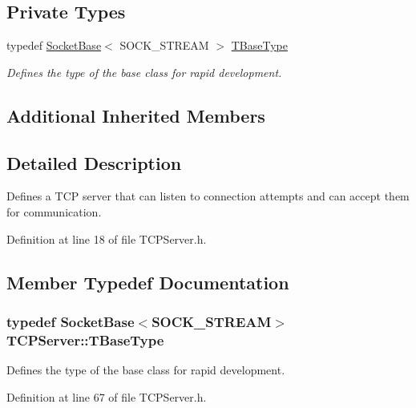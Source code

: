 \subsection*{Private Types}
\begin{DoxyCompactItemize}
\item 
typedef \hyperlink{class_socket_base}{Socket\-Base}$<$ S\-O\-C\-K\-\_\-\-S\-T\-R\-E\-A\-M $>$ \hyperlink{class_t_c_p_server_aed13a25d9b432da0be24ade2206a0914}{T\-Base\-Type}
\begin{DoxyCompactList}\small\item\em Defines the type of the base class for rapid development. \end{DoxyCompactList}\end{DoxyCompactItemize}
\subsection*{Additional Inherited Members}


\subsection{Detailed Description}
Defines a T\-C\-P server that can listen to connection attempts and can accept them for communication. 

Definition at line 18 of file T\-C\-P\-Server.\-h.



\subsection{Member Typedef Documentation}
\hypertarget{class_t_c_p_server_aed13a25d9b432da0be24ade2206a0914}{
\subsubsection[{T\-Base\-Type}]{\setlength{\rightskip}{0pt plus 5cm}typedef {\bf Socket\-Base}$<$S\-O\-C\-K\-\_\-\-S\-T\-R\-E\-A\-M$>$ {\bf T\-C\-P\-Server\-::\-T\-Base\-Type}\hspace{0.3cm}{\ttfamily [private]}}}\label{class_t_c_p_server_aed13a25d9b432da0be24ade2206a0914}


Defines the type of the base class for rapid development. 



Definition at line 67 of file T\-C\-P\-Server.\-h.



